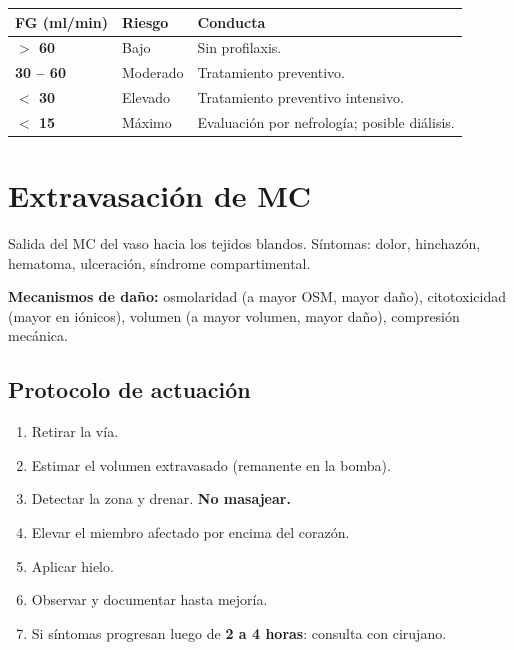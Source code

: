 {\renewcommand{\arraystretch}{1.35}
\begin{center}
\begin{tabular}{>{\bfseries}p{3.5cm} p{3cm} p{6cm}}
\hline
FG (ml/min) & Riesgo & Conducta \\
\hline
$>$ 60 & Bajo & Sin profilaxis. \\
\hline
30 -- 60 & Moderado & Tratamiento preventivo. \\
\hline
$<$ 30 & Elevado & Tratamiento preventivo intensivo. \\
\hline
$<$ 15 & Máximo & Evaluación por nefrología; posible diálisis. \\
\hline
\end{tabular}
\end{center}


\section*{Extravasación de MC}

Salida del MC del vaso hacia los tejidos blandos. Síntomas: dolor, hinchazón, hematoma, ulceración, síndrome compartimental.

\textbf{Mecanismos de daño:} osmolaridad (a mayor OSM, mayor daño), citotoxicidad (mayor en iónicos), volumen (a mayor volumen, mayor daño), compresión mecánica.

\subsection*{Protocolo de actuación}
\begin{enumerate}[noitemsep]
  \item Retirar la vía.
  \item Estimar el volumen extravasado (remanente en la bomba).
  \item Detectar la zona y drenar. \textbf{No masajear.}
  \item Elevar el miembro afectado por encima del corazón.
  \item Aplicar hielo.
  \item Observar y documentar hasta mejoría.
  \item Si síntomas progresan luego de \textbf{2 a 4 horas}: consulta con cirujano.
\end{enumerate}

}
